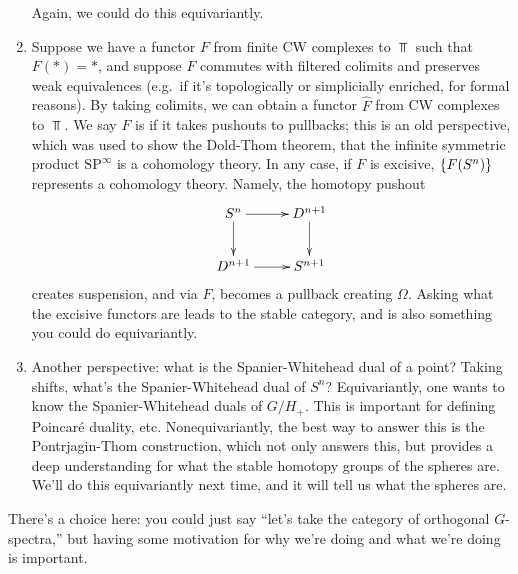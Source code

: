 \begin{enumerate}
	Again, we could do this equivariantly.
	\item Suppose we have a functor $F$ from finite CW complexes to $\Top$ such that $F(*) = *$, and suppose $F$
	commutes with filtered colimits and preserves weak equivalences (e.g.\ if it's topologically or simplicially
	enriched, for formal reasons). By taking colimits, we can obtain a functor $\widehat F$ from CW complexes to
	$\Top$. We say $F$ is  if it takes pushouts to pullbacks; this is an old perspective, which was
	used to show the Dold-Thom theorem, that the infinite symmetric product $\mathrm{SP}^\infty$ is a cohomology
	theory. In any case, if $F$ is excisive, $\{F(S^n)\}$ represents a cohomology theory. Namely, the homotopy
	pushout
	\[\xymatrix{S^n\ar[r]\ar[d] & D^{n+1}\ar[d]\\
	D^{n+1}\ar[r] & S^{n+1}
	}\]
	creates suspension, and via $F$, becomes a pullback creating $\Omega$. Asking what the excisive functors are
	leads to the stable category, and is also something you could do equivariantly.
	\item Another perspective: what is the Spanier-Whitehead dual of a point? Taking shifts, what's the
	Spanier-Whitehead dual of $S^n$? Equivariantly, one wants to know the Spanier-Whitehead duals of $G/H_+$. This
	is important for defining Poincaré duality, etc. Nonequivariantly, the best way to answer this is the
	Pontrjagin-Thom construction, which not only answers this, but provides a deep understanding for what the
	stable homotopy groups of the spheres are. We'll do this equivariantly next time, and it will tell us what the
	spheres are.
\end{enumerate}
There's a choice here: you could just say ``let's take the category of orthogonal $G$-spectra,'' but having some
motivation for why we're doing and what we're doing is important.
